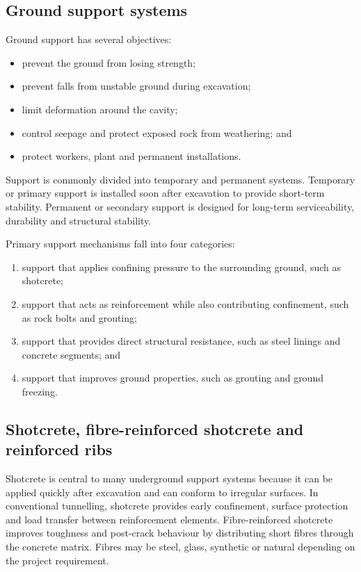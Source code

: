 \subsection{Ground support systems}
\label{sec:support-systems}
Ground support has several objectives:
\begin{itemize}
 \item prevent the ground from losing strength;
 \item prevent falls from unstable ground during excavation;
 \item limit deformation around the cavity;
 \item control seepage and protect exposed rock from weathering; and
 \item protect workers, plant and permanent installations.
\end{itemize}

Support is commonly divided into temporary and permanent systems. Temporary or primary support is installed soon after excavation to provide short-term stability. Permanent or secondary support is designed for long-term serviceability, durability and structural stability.

Primary support mechanisms fall into four categories:
\begin{enumerate}
 \item support that applies confining pressure to the surrounding ground, such as shotcrete;
 \item support that acts as reinforcement while also contributing confinement, such as rock bolts and grouting;
 \item support that provides direct structural resistance, such as steel linings and concrete segments; and
 \item support that improves ground properties, such as grouting and ground freezing.
\end{enumerate}

\subsection{Shotcrete, fibre-reinforced shotcrete and reinforced ribs}
\label{sec:shotcrete}
Shotcrete is central to many underground support systems because it can be applied quickly after excavation and can conform to irregular surfaces. In conventional tunnelling, shotcrete provides early confinement, surface protection and load transfer between reinforcement elements. Fibre-reinforced shotcrete improves toughness and post-crack behaviour by distributing short fibres through the concrete matrix. Fibres may be steel, glass, synthetic or natural depending on the project requirement.

